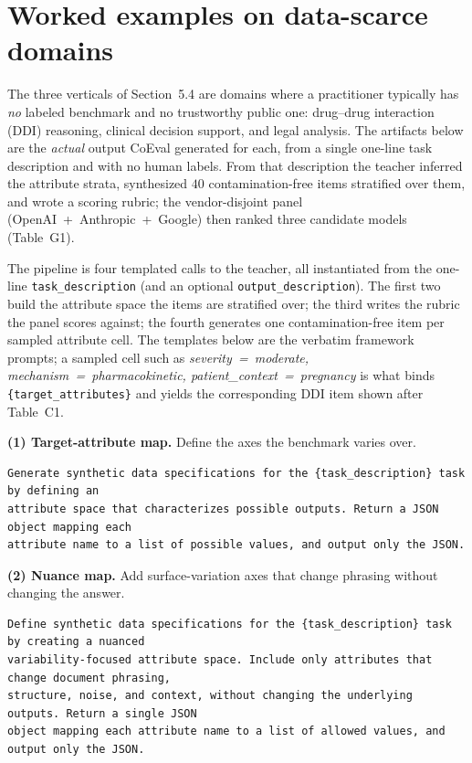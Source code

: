\documentclass[11pt,a4paper]{article}
\begin{document}
\section{Worked examples on data-scarce domains}\label{appC}

The three verticals of Section~5.4 are domains where a practitioner typically has \emph{no} labeled
benchmark and no trustworthy public one: drug--drug interaction (DDI) reasoning, clinical decision support, and
legal analysis. The artifacts below are the \emph{actual} output CoEval generated for each, from a single one-line
task description and with no human labels. From that description the teacher inferred the attribute strata, synthesized
\(40\) contamination-free items stratified over them, and wrote a scoring rubric; the vendor-disjoint panel
(OpenAI~+~Anthropic~+~Google) then ranked three candidate models (Table~G1).

The pipeline is four templated calls to the teacher, all instantiated from the one-line
\texttt{task\_description} (and an optional \texttt{output\_description}). The first two build the attribute
space the items are stratified over; the third writes the rubric the panel scores against; the fourth generates one
contamination-free item per sampled attribute cell. The templates below are the verbatim framework prompts; a sampled
cell such as \emph{severity~=~moderate, mechanism~=~pharmacokinetic, patient\_context~=~pregnancy}
is what binds \texttt{\{target\_attributes\}} and yields the corresponding DDI item shown after Table~C1.

\textbf{(1) Target-attribute map.} Define the axes the benchmark varies over.

\begin{Verbatim}[breaklines=true,breakanywhere=true,fontsize=\small]
Generate synthetic data specifications for the {task_description} task by defining an
attribute space that characterizes possible outputs. Return a JSON object mapping each
attribute name to a list of possible values, and output only the JSON.
\end{Verbatim}


\textbf{(2) Nuance map.} Add surface-variation axes that change phrasing without changing the answer.

\begin{Verbatim}[breaklines=true,breakanywhere=true,fontsize=\small]
Define synthetic data specifications for the {task_description} task by creating a nuanced
variability-focused attribute space. Include only attributes that change document phrasing,
structure, noise, and context, without changing the underlying outputs. Return a single JSON
object mapping each attribute name to a list of allowed values, and output only the JSON.
\end{Verbatim}
\end{document}
